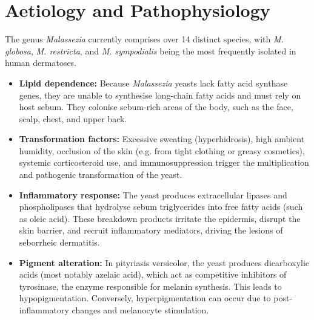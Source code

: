 \section*{Aetiology and Pathophysiology}
The genus \textit{Malassezia} currently comprises over 14 distinct species, with \textit{M. globosa}, \textit{M. restricta}, and \textit{M. sympodialis} being the most frequently isolated in human dermatoses.
\begin{itemize}
    \item \textbf{Lipid dependence:} Because \textit{Malassezia} yeasts lack fatty acid synthase genes, they are unable to synthesise long-chain fatty acids and must rely on host sebum. They colonise sebum-rich areas of the body, such as the face, scalp, chest, and upper back.
    \item \textbf{Transformation factors:} Excessive sweating (hyperhidrosis), high ambient humidity, occlusion of the skin (e.g. from tight clothing or greasy cosmetics), systemic corticosteroid use, and immunosuppression trigger the multiplication and pathogenic transformation of the yeast.
    \item \textbf{Inflammatory response:} The yeast produces extracellular lipases and phospholipases that hydrolyse sebum triglycerides into free fatty acids (such as oleic acid). These breakdown products irritate the epidermis, disrupt the skin barrier, and recruit inflammatory mediators, driving the lesions of seborrheic dermatitis.
    \item \textbf{Pigment alteration:} In pityriasis versicolor, the yeast produces dicarboxylic acids (most notably azelaic acid), which act as competitive inhibitors of tyrosinase, the enzyme responsible for melanin synthesis. This leads to hypopigmentation. Conversely, hyperpigmentation can occur due to post-inflammatory changes and melanocyte stimulation.
\end{itemize}

